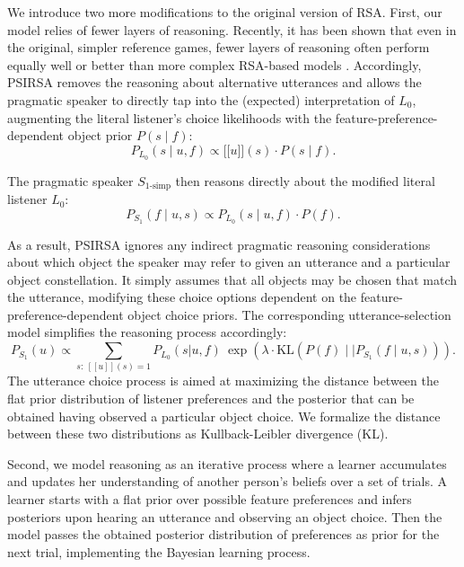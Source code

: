 \documentclass[10pt,a4paper]{article}
\newcommand{\sem}[1]{\mbox{$[\![$#1$]\!]$}}
\begin{document}
We introduce two more modifications to the original version of RSA. First, our model relies of fewer layers of reasoning. Recently, it has been shown that even in the original, simpler reference games, fewer layers of reasoning often perform equally well or better than more complex RSA-based models \cite{sikos2019}.
Accordingly, PSIRSA removes the reasoning about alternative utterances and allows the pragmatic speaker to directly tap into the (expected) interpretation of $L_0$, augmenting the literal listener's choice likelihoods with the feature-preference-dependent object prior $P(s\mid f)$:
\begin{equation}
P_{L_{0}}(s\mid u,f) \propto \sem{$u$}(s) \cdot P(s\mid f).
\end{equation}

The pragmatic speaker $S_{1\textrm{-simp}}$ then reasons directly about the modified literal listener $L_{0}$: 
\begin{equation}
P_{S_{1}}(f\mid u,s) \propto P_{L_{0}}(s\mid u,f) \cdot P(f).
\end{equation}

As a result, PSIRSA ignores any indirect pragmatic reasoning considerations about which object the speaker may refer to given an utterance and a particular object constellation.
It simply assumes that all objects may be chosen that match the utterance, modifying these choice options dependent on the feature-preference-dependent object choice priors. The corresponding utterance-selection model simplifies the reasoning process accordingly:
\begin{equation}
P_{S_1}(u) \propto \sum_{s:\  [\![u]\!](s)=1} P_{L_0}(s|u,f)\ \exp(\lambda \cdot \textrm{KL}(P(f)\mid\mid P_{S_{1}}(f\mid u,s))).
\label{eq:kldivlambdasimp}
\end{equation}
The utterance choice process is aimed at maximizing the distance between the flat prior distribution of listener preferences and the posterior that can be obtained having observed a particular object choice. We formalize the distance between these two distributions as Kullback-Leibler divergence (KL).

Second, we model reasoning as an iterative process where a learner accumulates and updates her understanding of another person's beliefs over a set of trials. A learner starts with a flat prior over possible feature preferences and infers posteriors upon hearing an utterance and observing an object choice. Then the model passes the obtained posterior distribution of preferences as prior for the next trial, implementing the Bayesian learning process.
\end{document}
